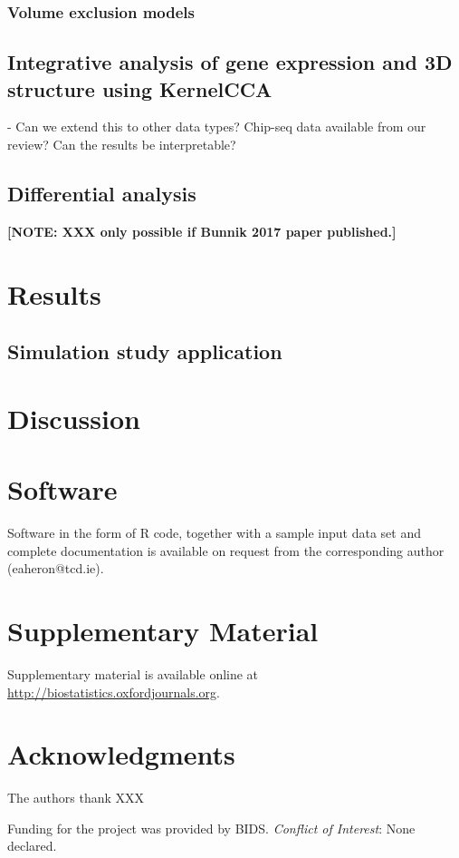 \documentclass[oupdraft]{bio}
\newcommand{\note}[1]{\textbf{[NOTE: #1]}}
\begin{document}
\subsubsection{Volume exclusion models}

\subsection{Integrative analysis of gene expression and 3D structure using KernelCCA}

- Can we extend this to other data types? Chip-seq data available from our
review? Can the results be interpretable?

\subsection{Differential analysis}
\note{XXX only possible if Bunnik 2017 paper published.}

\section{Results}
\label{sec3}

\subsection{Simulation study application}

\section{Discussion}
\label{sec4}



\section{Software}
\label{sec5}

Software in the form of R code, together with a sample
input data set and complete documentation is available on
request from the corresponding author (eaheron@tcd.ie).


\section{Supplementary Material}
\label{sec6}

Supplementary material is available online at
\url{http://biostatistics.oxfordjournals.org}.


\section*{Acknowledgments}

The authors thank XXX

Funding for the project was provided by BIDS.
{\it Conflict of Interest}: None declared.






\begin{figure}[!p]
\centering
\caption{}
\label{Fig1}
\end{figure}
\end{document}
